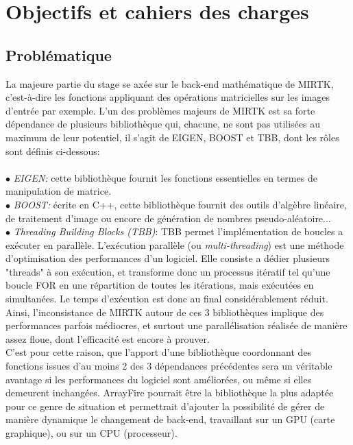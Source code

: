 \documentclass[10pt]{report}
\begin{document}
\chapter{Objectifs et cahiers des charges}
	\section{Problématique} %
	
	La majeure partie du stage se axée sur le back-end mathématique de MIRTK, c'est-à-dire les fonctions appliquant des opérations matricielles sur les images d'entrée par exemple. L'un des problèmes majeurs de MIRTK est sa forte dépendance de plusieurs bibliothèque qui, chacune, ne sont pas utilisées au maximum de leur potentiel, il s'agit de EIGEN, BOOST et TBB, dont les rôles sont définis ci-dessous:\\
		\\{$\bullet$} \textit{EIGEN:} cette bibliothèque fournit les fonctions essentielles en termes de manipulation de matrice. \newline
		\\{$\bullet$} \textit{BOOST:} écrite en C++, cette bibliothèque fournit des outils d'algèbre linéaire, de traitement d'image ou encore de génération de nombres pseudo-aléatoire... \newline
		\\{$\bullet$} \textit{Threading Building Blocks (TBB)}: TBB permet l'implémentation de boucles a exécuter en parallèle. L'exécution parallèle (ou \textit{multi-threading}) est une méthode d'optimisation des performances d'un logiciel. Elle consiste a dédier plusieurs "threads" à son exécution, et transforme donc un processus itératif tel qu'une boucle FOR en une répartition de toutes les itérations, mais exécutées en simultanées. Le temps d'exécution est donc au final considérablement réduit. \newline
	\\ Ainsi, l'inconsistance de MIRTK autour de ces 3 bibliothèques implique des performances parfois médiocres, et surtout une parallélisation réalisée de manière assez floue, dont l'efficacité est encore à prouver.  
	\\ C'est pour cette raison, que l'apport d'une bibliothèque coordonnant des fonctions issues d'au moins 2 des 3 dépendances précédentes sera un véritable avantage si les performances du logiciel sont améliorées, ou même si elles demeurent inchangées. ArrayFire pourrait être la bibliothèque la plus adaptée pour ce genre de situation et permettrait d'ajouter la possibilité de gérer de manière dynamique le changement de back-end, travaillant sur un GPU (carte graphique), ou sur un CPU (processeur).
		
\end{document}
